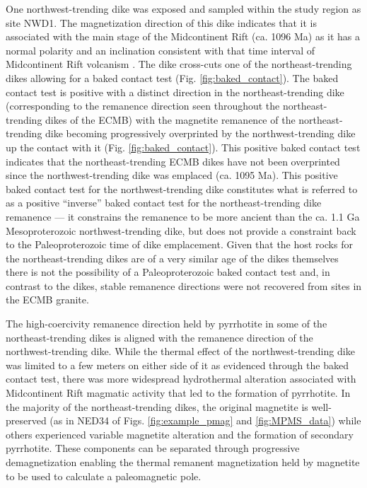 \documentclass[draft]{agujournal2019}
\begin{document}
One northwest-trending dike was exposed and sampled within the study region as site NWD1. The magnetization direction of this dike indicates that it is associated with the main stage of the Midcontinent Rift (ca. 1096 Ma) as it has a normal polarity and an inclination consistent with that time interval of Midcontinent Rift volcanism \cite{Swanson-Hysell2019a, Swanson-Hysell2020a}. The dike cross-cuts one of the northeast-trending dikes allowing for a baked contact test (Fig. \ref{fig:baked_contact}). The baked contact test is positive with a distinct direction in the northeast-trending dike (corresponding to the remanence direction seen throughout the northeast-trending dikes of the ECMB) with the magnetite remanence of the northeast-trending dike becoming progressively overprinted by the northwest-trending dike up the contact with it (Fig. \ref{fig:baked_contact}). This positive baked contact test indicates that the northeast-trending ECMB dikes have not been overprinted since the northwest-trending dike was emplaced (ca. 1095 Ma). This positive baked contact test for the northwest-trending dike constitutes what is referred to as a positive ``inverse'' baked contact test for the northeast-trending dike remanence --- it constrains the remanence to be more ancient than the ca. 1.1 Ga Mesoproterozoic northwest-trending dike, but does not provide a constraint back to the Paleoproterozoic time of dike emplacement. Given that the host rocks for the northeast-trending dikes are of a very similar age of the dikes themselves there is not the possibility of a Paleoproterozoic baked contact test and, in contrast to the dikes, stable remanence directions were not recovered from sites in the ECMB granite. 

The high-coercivity remanence direction held by pyrrhotite in some of the northeast-trending dikes is aligned with the remanence direction of the northwest-trending dike. While the thermal effect of the northwest-trending dike was limited to a few meters on either side of it as evidenced through the baked contact test, there was more widespread hydrothermal alteration associated with Midcontinent Rift magmatic activity that led to the formation of pyrrhotite. In the majority of the northeast-trending dikes, the original magnetite is well-preserved (as in NED34 of Figs. \ref{fig:example_pmag} and \ref{fig:MPMS_data}) while others experienced variable magnetite alteration and the formation of secondary pyrrhotite. These components can be separated through progressive demagnetization enabling the thermal remanent magnetization held by magnetite to be used to calculate a paleomagnetic pole.
\end{document}
